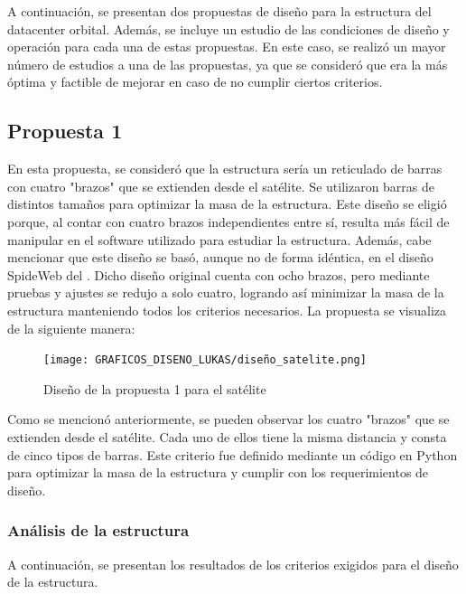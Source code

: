 A continuación, se presentan dos propuestas de diseño para la estructura del datacenter orbital. Además, se incluye un estudio de las condiciones de diseño y operación para cada una de estas propuestas. En este caso, se realizó un mayor número de estudios a una de las propuestas, ya que se consideró que era la más óptima y factible de mejorar en caso de no cumplir ciertos criterios.

\subsection{Propuesta 1}

En esta propuesta, se consideró que la estructura sería un reticulado de barras con cuatro "brazos" que se extienden desde el satélite. Se utilizaron barras de distintos tamaños para optimizar la masa de la estructura. Este diseño se eligió porque, al contar con cuatro brazos independientes entre sí, resulta más fácil de manipular en el software utilizado para estudiar la estructura. Además, cabe mencionar que este diseño se basó, aunque no de forma idéntica, en el diseño SpideWeb del \cite{hoyt2014trusselator}. Dicho diseño original cuenta con ocho brazos, pero mediante pruebas y ajustes se redujo a solo cuatro, logrando así minimizar la masa de la estructura manteniendo todos los criterios necesarios. La propuesta se visualiza de la siguiente manera:

\begin{figure}[H]
    \centering
    \texttt{[image: GRAFICOS\_DISENO\_LUKAS/diseño\_satelite.png]}
    \caption{Diseño de la propuesta 1 para el satélite}
    \label{fig:propuesta1}
\end{figure}

Como se mencionó anteriormente, se pueden observar los cuatro "brazos" que se extienden desde el satélite. Cada uno de ellos tiene la misma distancia y consta de cinco tipos de barras. Este criterio fue definido mediante un código en Python para optimizar la masa de la estructura y cumplir con los requerimientos de diseño.

\subsubsection{Análisis de la estructura}

A continuación, se presentan los resultados de los criterios exigidos para el diseño de la estructura.


